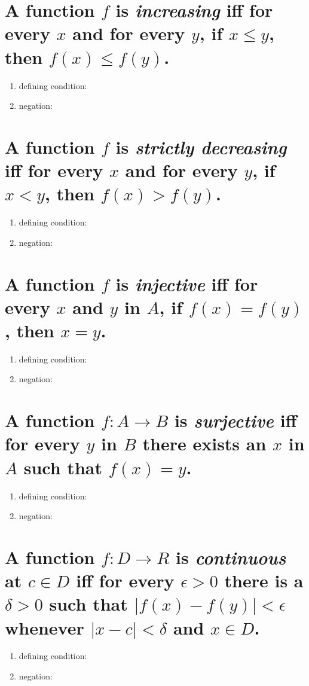 \documentclass[11pt]{article} %
\begin{document}
\section{A function $f$ is \textit{increasing} iff for every $x$ and for every $y$, if $x\leq y$, then $f(x)\leq f(y)$.}
\begin{enumerate}
\item defining condition:
\item negation:
\end{enumerate}

\section{A function $f$ is \textit{strictly decreasing} iff for every $x$ and for every $y$, if $x<y$, then $f(x)>f(y)$.}
\begin{enumerate}
\item defining condition:
\item negation:
\end{enumerate}

\section{A function $f$ is \textit{injective} iff for every $x$ and $y$ in $A$, if $f(x)=f(y)$, then $x=y$.}
\begin{enumerate}
\item defining condition:
\item negation:
\end{enumerate}

\section{A function $f:A\rightarrow B$ is \textit{surjective} iff for every $y$ in $B$ there exists an $x$ in $A$ such that $f(x)=y$.}
\begin{enumerate}
\item defining condition:
\item negation:
\end{enumerate}

\section{A function $f:D\rightarrow R$ is \textit{continuous} at $c \in D$ iff for every $\epsilon>0$ there is a $\delta>0$ such that $\mid f(x)-f(y)\mid<\epsilon$ whenever $\mid x-c\mid<\delta$ and $x\in D$.}
\begin{enumerate}
\item defining condition:
\item negation:
\end{enumerate}
\end{document}

